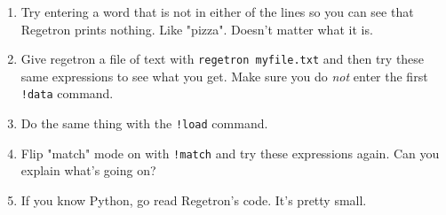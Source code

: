 \begin{enumerate}
\item Try entering a word that is not in either of the lines so you can see
    that Regetron prints nothing.  Like "pizza". Doesn't matter what it is.
\item Give regetron a file of text with \verb|regetron myfile.txt| and then
    try these same expressions to see what you get.  Make sure you do \emph{not}
    enter the first \verb|!data| command.
\item Do the same thing with the \verb|!load| command.
\item Flip "match" mode on with \verb|!match| and try these expressions again.
    Can you explain what's going on?
\item If you know Python, go read Regetron's code.  It's pretty small.
\end{enumerate}

